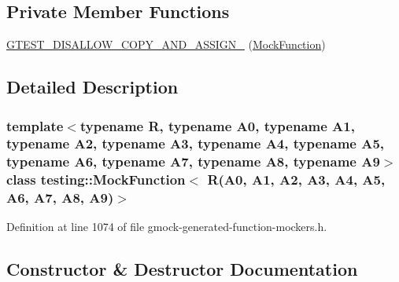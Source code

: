 \subsection*{Private Member Functions}
\begin{DoxyCompactItemize}
\item 
\hyperlink{classtesting_1_1MockFunction_3_01R_07A0_00_01A1_00_01A2_00_01A3_00_01A4_00_01A5_00_01A6_00_01A7_00_01A8_00_01A9_08_4_a3f1fba3bf01a4206584eeef1352c83a9}{G\+T\+E\+S\+T\+\_\+\+D\+I\+S\+A\+L\+L\+O\+W\+\_\+\+C\+O\+P\+Y\+\_\+\+A\+N\+D\+\_\+\+A\+S\+S\+I\+G\+N\+\_\+} (\hyperlink{classtesting_1_1MockFunction}{Mock\+Function})
\end{DoxyCompactItemize}


\subsection{Detailed Description}
\subsubsection*{template$<$typename R, typename A0, typename A1, typename A2, typename A3, typename A4, typename A5, typename A6, typename A7, typename A8, typename A9$>$\newline
class testing\+::\+Mock\+Function$<$ R(\+A0, A1, A2, A3, A4, A5, A6, A7, A8, A9)$>$}



Definition at line 1074 of file gmock-\/generated-\/function-\/mockers.\+h.



\subsection{Constructor \& Destructor Documentation}
\mbox{\label{classtesting_1_1MockFunction_3_01R_07A0_00_01A1_00_01A2_00_01A3_00_01A4_00_01A5_00_01A6_00_01A7_00_01A8_00_01A9_08_4_af5faa98b52d5b5032c57022cdf96d21d}} 
